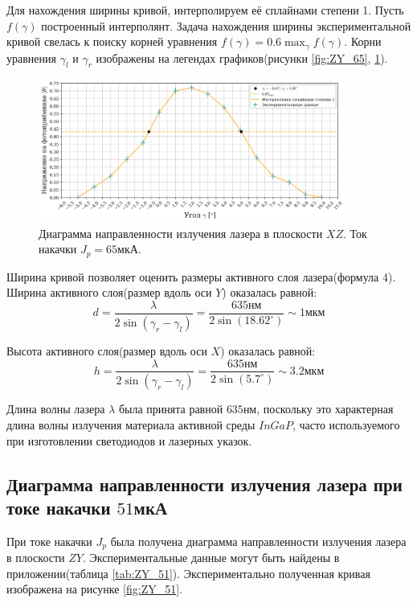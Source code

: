 \documentclass[a4paper, 12pt]{extarticle}
\begin{document}
Для нахождения ширины кривой, интерполируем её сплайнами степени 1. Пусть $f(\gamma)$ построенный интерполянт. Задача нахождения ширины экспериментальной кривой свелась к поиску корней уравнения $f(\gamma) = 0.6 \max_{\gamma} f(\gamma)$. Корни уравнения $\gamma_l$ и $\gamma_r$ изображены на легендах графиков(рисунки \ref{fig:ZY_65}, \ref{fig:XZ_65}).



\begin{figure}[htbp]
    \centering
    \includegraphics[width = 0.9\textwidth]{pics/vertical_65_muA.png}
    \caption{Диаграмма направленности излучения лазера в плоскости $XZ$. Ток накачки $J_p = 65\text{мкА}$.}
    \label{fig:XZ_65}
\end{figure}

Ширина кривой позволяет оценить размеры активного слоя лазера(формула 4). Ширина активного слоя(размер вдоль оси $Y$) оказалась равной:
$$
d = \frac{\lambda}{2 \sin(\gamma_r - \gamma_l)} = \frac{635 \text{нм}}{2 \sin(18.62^{\circ})} \sim 1 \text{мкм}
$$

Высота активного слоя(размер вдоль оси $X$) оказалась равной:
$$
h = \frac{\lambda}{2 \sin(\gamma_r - \gamma_l)} = \frac{635 \text{нм}}{2 \sin(5.7^{\circ})} \sim 3.2 \text{мкм}
$$

Длина волны лазера $\lambda$ была принята равной $635\text{нм}$, поскольку это характерная длина волны излучения материала активной среды $InGaP$, часто используемого при изготовлении светодиодов и лазерных указок.


\subsection*{\textcolor{sub_header}{Диаграмма направленности излучения лазера при токе накачки $51$мкА}}

При токе накачки $J_p$ была получена диаграмма направленности излучения лазера в плоскости $ZY$. Экспериментальные данные могут быть найдены в приложении(таблица \ref{tab:ZY_51}). Экспериментально полученная кривая изображена на рисунке  \ref{fig:ZY_51}.
\end{document}
